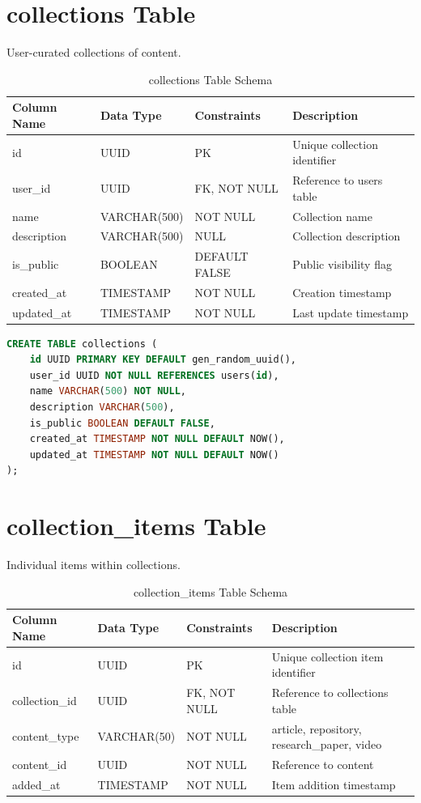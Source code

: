 \documentclass[12pt,a4paper]{report}
\begin{document}
\newpage
\section{collections Table}

User-curated collections of content.

\begin{table}[h]
\centering
\small
\caption{collections Table Schema}
\begin{tabular}{|l|l|l|l|}
\toprule
\textbf{Column Name} & \textbf{Data Type} & \textbf{Constraints} & \textbf{Description} \\
\midrule
id & UUID & PK & Unique collection identifier \\
user\_id & UUID & FK, NOT NULL & Reference to users table \\
name & VARCHAR(500) & NOT NULL & Collection name \\
description & VARCHAR(500) & NULL & Collection description \\
is\_public & BOOLEAN & DEFAULT FALSE & Public visibility flag \\
created\_at & TIMESTAMP & NOT NULL & Creation timestamp \\
updated\_at & TIMESTAMP & NOT NULL & Last update timestamp \\
\bottomrule
\end{tabular}
\end{table}

\begin{lstlisting}[language=SQL,basicstyle=\ttfamily\small]
CREATE TABLE collections (
    id UUID PRIMARY KEY DEFAULT gen_random_uuid(),
    user_id UUID NOT NULL REFERENCES users(id),
    name VARCHAR(500) NOT NULL,
    description VARCHAR(500),
    is_public BOOLEAN DEFAULT FALSE,
    created_at TIMESTAMP NOT NULL DEFAULT NOW(),
    updated_at TIMESTAMP NOT NULL DEFAULT NOW()
);
\end{lstlisting}

\newpage
\section{collection\_items Table}

Individual items within collections.

\begin{table}[h]
\centering
\small
\caption{collection\_items Table Schema}
\begin{tabular}{|l|l|l|l|}
\toprule
\textbf{Column Name} & \textbf{Data Type} & \textbf{Constraints} & \textbf{Description} \\
\midrule
id & UUID & PK & Unique collection item identifier \\
collection\_id & UUID & FK, NOT NULL & Reference to collections table \\
content\_type & VARCHAR(50) & NOT NULL & article, repository, research\_paper, video \\
content\_id & UUID & NOT NULL & Reference to content \\
added\_at & TIMESTAMP & NOT NULL & Item addition timestamp \\
\bottomrule
\end{tabular}
\end{table}
\end{document}
